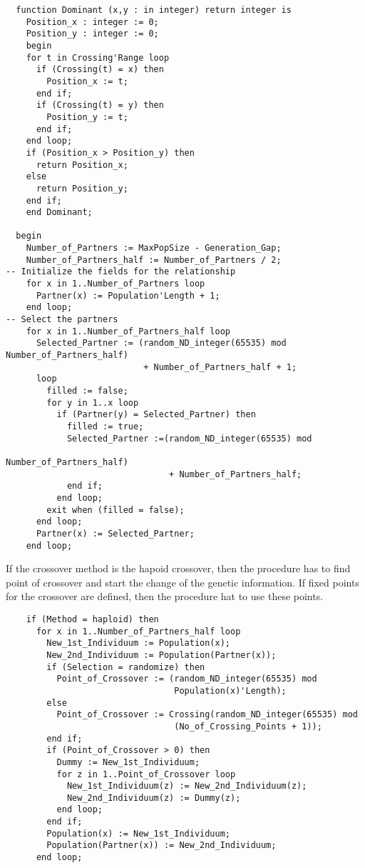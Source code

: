 \begin{verbatim}
  function Dominant (x,y : in integer) return integer is
    Position_x : integer := 0;
    Position_y : integer := 0;
    begin
    for t in Crossing'Range loop
      if (Crossing(t) = x) then
        Position_x := t;
      end if;
      if (Crossing(t) = y) then
        Position_y := t;
      end if;
    end loop;
    if (Position_x > Position_y) then
      return Position_x;
    else
      return Position_y;
    end if;
    end Dominant;

  begin
    Number_of_Partners := MaxPopSize - Generation_Gap;
    Number_of_Partners_half := Number_of_Partners / 2;
-- Initialize the fields for the relationship
    for x in 1..Number_of_Partners loop
      Partner(x) := Population'Length + 1;
    end loop;
-- Select the partners
    for x in 1..Number_of_Partners_half loop
      Selected_Partner := (random_ND_integer(65535) mod Number_of_Partners_half)
                           + Number_of_Partners_half + 1;
      loop
        filled := false;
        for y in 1..x loop
          if (Partner(y) = Selected_Partner) then
            filled := true;
            Selected_Partner :=(random_ND_integer(65535) mod
                                                Number_of_Partners_half)
                                + Number_of_Partners_half;
            end if;
          end loop;
        exit when (filled = false);
      end loop;
      Partner(x) := Selected_Partner;
    end loop;
\end{verbatim}
If the crossover method is the hapoid crossover, then the procedure has to find
point of crossover and start the change of the genetic information. If fixed
points for the crossover are defined, then the procedure hat to use these points.
\begin{verbatim}
    if (Method = haploid) then
      for x in 1..Number_of_Partners_half loop
        New_1st_Individuum := Population(x);
        New_2nd_Individuum := Population(Partner(x));
        if (Selection = randomize) then
          Point_of_Crossover := (random_ND_integer(65535) mod
                                 Population(x)'Length);
        else
          Point_of_Crossover := Crossing(random_ND_integer(65535) mod
                                 (No_of_Crossing_Points + 1));
        end if;
        if (Point_of_Crossover > 0) then
          Dummy := New_1st_Individuum;
          for z in 1..Point_of_Crossover loop
            New_1st_Individuum(z) := New_2nd_Individuum(z);
            New_2nd_Individuum(z) := Dummy(z);
          end loop;
        end if;
        Population(x) := New_1st_Individuum;
        Population(Partner(x)) := New_2nd_Individuum;
      end loop;
\end{verbatim}
